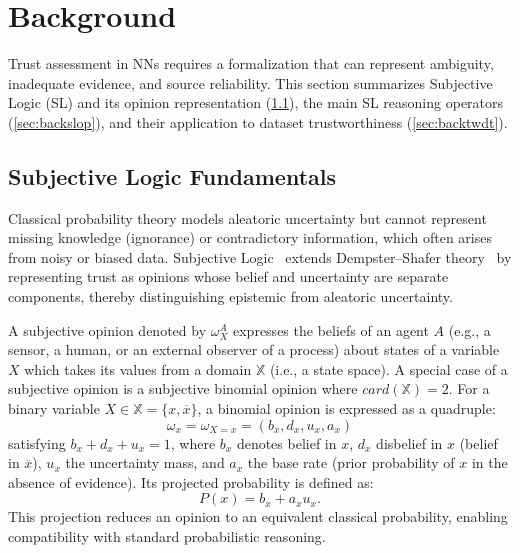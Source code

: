 \vspace{-0.5em}
\section{Background}\label{sec:back}
Trust assessment in NNs requires a formalization that can represent ambiguity, inadequate evidence, and source reliability. This section summarizes Subjective Logic (SL) and its opinion representation (\cref{sec:backsl}), the main SL reasoning operators (\cref{sec:backslop}), and their application to dataset trustworthiness (\cref{sec:backtwdt}).
\vspace{-0.5em}
\subsection{Subjective Logic Fundamentals}\label{sec:backsl}
Classical probability theory models aleatoric uncertainty but cannot represent missing knowledge (ignorance) or contradictory information, which often arises from noisy or biased data. Subjective Logic~\cite{josang2016subjective} extends Dempster–Shafer theory~\cite{dempster1967upper,shafer1976mathematical} by representing trust as opinions whose belief and uncertainty are separate components, thereby distinguishing epistemic from aleatoric uncertainty.

A subjective opinion denoted by \(\omega_X^A\) expresses the beliefs of an agent \(A\) (e.g., a sensor, a human, or an external observer of a process) about states of a variable $X$ which takes its values from a domain $\mathbb{X}$ (i.e., a state space). A special case of a subjective opinion is a subjective binomial opinion where $card(\mathbb{X})=2$. For a binary variable $X \in \mathbb{X} = \{x, \overline{x}\}$, a binomial opinion is expressed as a quadruple:
\vspace{-0.5em}
\begin{equation}
\omega_x = \omega_{X=x} = (b_x, d_x, u_x, a_x)
\end{equation}
satisfying $b_x + d_x + u_x = 1$, where $b_x$ denotes belief in $x$, $d_x$ disbelief in $x$ (belief in \(\overline{x}\)), $u_x$ the uncertainty mass, and $a_x$ the base rate (prior probability of $x$ in the absence of evidence). Its projected probability is defined as:
\vspace{-0.5em}
\begin{equation}
P(x) = b_x + a_x u_x.
\label{eq:projected_prob}
\end{equation}
This projection reduces an opinion to an equivalent classical probability, enabling compatibility with standard probabilistic reasoning.

